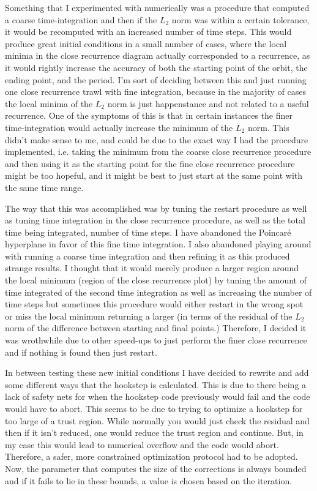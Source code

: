 Something that I experimented with numerically was a procedure that computed a coarse time-integration
and then if the $L_2$ norm was within a certain tolerance, it would be recomputed with an increased number
of time steps. This would produce great initial conditions in a small number of cases, where the local minima in the
close recurrence diagram actually corresponded to a recurrence, as it would rightly increase the accuracy of both
the starting point of the orbit, the ending point, and the period. I'm sort of deciding between this
and just running one close recurrence trawl with fine integration, because in the majority of cases the
local minima of the $L_2$ norm is just happenstance and not related to a useful recurrence. One of the
symptoms of this is that in certain instances the finer time-integration would actually increase
the minimum of the $L_2$ norm. This didn't make sense to me, and could be due to the exact way I had the
procedure implemented, i.e. taking the minimum from the coarse close recurrence procedure and then
using it as the starting point for the fine close recurrence procedure might be too hopeful, and it might
be best to just start at the same point with the same time range.

The way that this was accomplished was by tuning the restart procedure as
well as tuning time integration in the close recurrence procedure, as
well as the total time being integrated, number of time steps. I have
abandoned the Poincar\'e hyperplane in favor of this fine time
integration. I also abandoned playing around with running a coarse time
integration and then refining it as this produced strange results. I
thought that it would merely produce a larger region around the local
minimum (region of the close recurrence plot) by tuning the amount of
time integrated of the second time integration as well as increasing the
number of time steps but sometimes this procedure would either restart in
the wrong spot or miss the local minimum returning a larger (in terms of
the residual of the $L_2$ norm of the difference between starting and
final points.) Therefore, I decided it was wrothwhile due to other
speed-ups to just perform the finer close recurrence and if nothing is
found then just restart.

In between testing these new initial conditions I have decided to rewrite
and add some different ways that the hookstep is calculated. This is due
to there being a lack of safety nets for when the hookstep code
previously would fail and the code would have to abort. This seems to be
due to trying to optimize a hookstep for too large of a trust region.
While normally you would just check the residual and then if it isn't
reduced, one would reduce the trust region and continue. But, in my case
this would lead to numerical overflow and the code would abort.
Therefore, a safer, more constrained optimization protocol had to be
adopted. Now, the parameter that computes the size of the corrections is
always bounded and if it fails to lie in these bounds, a value is chosen
based on the iteration.

